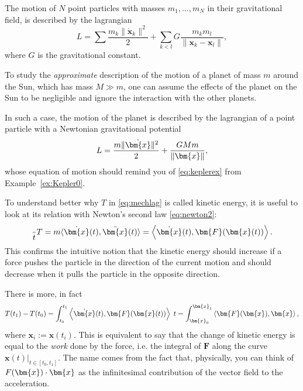 \documentclass[english,fontsize=11pt,paper=a5,oneside]{scrbook}
\newcommand{\bx}{\bm{x}}
\newcommand{\lag}{\langle}
\newcommand{\rag}{\rangle}
\let\d\relax
\DeclareMathOperator{\d}{d}
\theoremstyle{definition}
\newenvironment{example}
  {\pushQED{\qed}\renewcommand{\qedsymbol}{$\lozenge$}\examplex}
  {\popQED\endexamplex}
\begin{document}
\begin{example}\label{ex:kepler1}
    The motion of $N$ point particles with masses $m_1, \ldots, m_N$ in their gravitational field, is described by the lagrangian
    \begin{equation}
        L = \sum\frac{m_k \|\dot{\bx}_k\|^2}{2} + \sum_{k < l} G \frac{m_k m_l}{\|\bx_k - \bx_l\|},
    \end{equation}
    where $G$ is the gravitational constant.

    To study the \emph{approximate} description of the motion of a planet of mass $m$ around the Sun, which has mass $M \gg m$, one can assume the effects of the planet on the Sun to be negligible and ignore the interaction with the other planets.

    In such a case, the motion of the planet is described by the lagrangian of a point particle with a Newtonian gravitational potential
    \begin{equation}
        L = \frac{m\|\dot\bx\|^2}{2} + \frac{G M m}{\|\bx\|},
    \end{equation}
    whose equation of motion should remind you of \eqref{eq:keplerex} from Example~\ref{ex:Kepler0}.
\end{example}

To understand better why $T$ in \eqref{eq:mechlag} is called kinetic energy, it is useful to look at its relation with Newton's second law \eqref{eq:newton2}:
\begin{equation}
    \frac{\d}{\d t} T
        = m \lag\dot \bx(t), \ddot \bx(t)\rag
        = \left\lag\dot \bx(t), \bm{F}(\bx(t))\right\rag.
\end{equation}
This confirms the intuitive notion that the kinetic energy should increase if a force pushes the particle in the direction of the current motion and should decrease when it pulls the particle in the opposite direction.

There is more, in fact
\begin{equation}
    T(t_1) - T(t_0) = \int_{t_0}^{t_1} \left\lag\dot \bx(t), \bm{F}(\bx(t))\right\rag\; \d t = \int_{\bx_0}^{\bx_1} \left\lag\bm{F}(\bx), \d \bx\right\rag,
\end{equation}
where $\bx_i := \bx(t_i)$.
This is equivalent to say that the change of kinetic energy is equal to the \emph{work} done by the force, i.e. the integral of $\bm{F}$ along the curve $\bx(t)|_{t\in[t_0, t_1]}$. The name comes from the fact that, physically, you can think of $F(\bx) \cdot \d\bx$ as the infinitesimal contribution of the vector field to the acceleration.
\end{document}
